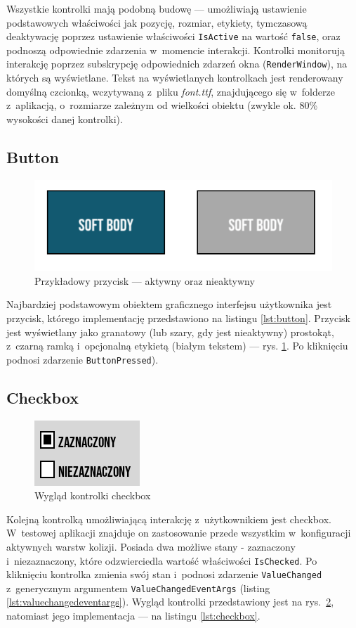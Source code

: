 Wszystkie kontrolki mają podobną budowę --- umożliwiają ustawienie podstawowych właściwości jak pozycję, rozmiar, etykiety, tymczasową deaktywację poprzez ustawienie właściwości \verb|IsActive| na wartość \verb|false|, oraz podnoszą odpowiednie zdarzenia w~momencie interakcji. Kontrolki monitorują interakcję poprzez subskrypcję odpowiednich zdarzeń okna (\verb|RenderWindow|), na których są wyświetlane. Tekst na wyświetlanych kontrolkach jest renderowany domyślną czcionką, wczytywaną z~pliku \textit{font.ttf}, znajdującego się w~folderze z~aplikacją, o~rozmiarze zależnym od wielkości obiektu (zwykle ok. 80\% wysokości danej kontrolki).

\subsection{Button}
\begin{figure}[ht]
	\centering
	\includegraphics[width=0.5\linewidth]{images/button}
	\caption{Przykładowy przycisk --- aktywny oraz nieaktywny}
	\label{fig:button}
\end{figure}

Najbardziej podstawowym obiektem graficznego interfejsu użytkownika jest przycisk, którego implementację przedstawiono na listingu \ref{lst:button}. Przycisk jest wyświetlany jako granatowy (lub szary, gdy jest nieaktywny) prostokąt, z~czarną ramką i~opcjonalną etykietą (białym tekstem) --- rys. \ref{fig:button}. Po kliknięciu podnosi zdarzenie \verb|ButtonPressed|).

\subsection{Checkbox}
\begin{figure}[th]
	\centering
	\includegraphics[width=0.2\linewidth]{images/checkbox}
	\caption{Wygląd kontrolki checkbox}
	\label{fig:checkbox}
\end{figure}
Kolejną kontrolką umożliwiającą interakcję z~użytkownikiem jest checkbox. W~testowej aplikacji znajduje on zastosowanie przede wszystkim w~konfiguracji aktywnych warstw kolizji. Posiada dwa możliwe stany - zaznaczony i~niezaznaczony, które odzwierciedla wartość właściwości \verb|IsChecked|. Po kliknięciu kontrolka zmienia swój stan i~podnosi zdarzenie \verb|ValueChanged| z~generycznym argumentem \verb|ValueChangedEventArgs| (listing \ref{lst:valuechangedeventargs}). Wygląd kontrolki przedstawiony jest na rys.~\ref{fig:checkbox}, natomiast jego implementacja --- na listingu \ref{lst:checkbox}.

